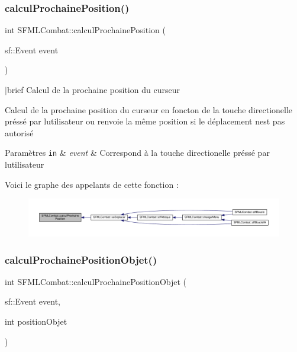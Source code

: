 \subsubsection{\texorpdfstring{calcul\+Prochaine\+Position()}{calculProchainePosition()}}
{\footnotesize\ttfamily int S\+F\+M\+L\+Combat\+::calcul\+Prochaine\+Position (\begin{DoxyParamCaption}\item[{sf\+::\+Event}]{event }\end{DoxyParamCaption})\hspace{0.3cm}{\ttfamily [private]}}

$\vert$brief Calcul de la prochaine position du curseur

Calcul de la prochaine position du curseur en foncton de la touche directionelle préssé par l\textquotesingle{}utilisateur ou renvoie la même position si le déplacement n\textquotesingle{}est pas autorisé 
\begin{DoxyParams}[1]{Paramètres}
\mbox{\tt in}  & {\em event} & Correspond à la touche directionelle préssé par l\textquotesingle{}utilisateur \\
\hline
\end{DoxyParams}
Voici le graphe des appelants de cette fonction \+:\nopagebreak
\begin{figure}[H]
\begin{center}
\leavevmode
\includegraphics[width=350pt]{class_s_f_m_l_combat_a2e7feee45aae418d7545cc71534e6148_icgraph}
\end{center}
\end{figure}
\mbox{\label{class_s_f_m_l_combat_a06e5c66f031d48316b7d779a9589c18e}} 
\subsubsection{\texorpdfstring{calcul\+Prochaine\+Position\+Objet()}{calculProchainePositionObjet()}}
{\footnotesize\ttfamily int S\+F\+M\+L\+Combat\+::calcul\+Prochaine\+Position\+Objet (\begin{DoxyParamCaption}\item[{sf\+::\+Event}]{event,  }\item[{int}]{position\+Objet }\end{DoxyParamCaption})\hspace{0.3cm}{\ttfamily [private]}}



